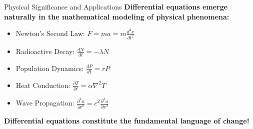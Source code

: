 \documentclass[10pt,aspectratio=169]{beamer}
\newcommand{\concept}[1]{\textbf{#1}}
\begin{document}
\begin{frame}{Physical Significance and Applications}
    \concept{Differential equations emerge naturally in the mathematical modeling of physical phenomena:}
    
    \vspace{0.3cm}
    
    \begin{itemize}
        \item Newton's Second Law: $F = ma = m\frac{d^2x}{dt^2}$
        \item Radioactive Decay: $\frac{dN}{dt} = -\lambda N$
        \item Population Dynamics: $\frac{dP}{dt} = rP$
        \item Heat Conduction: $\frac{\partial T}{\partial t} = \alpha \nabla^2 T$
        \item Wave Propagation: $\frac{\partial^2 u}{\partial t^2} = c^2 \frac{\partial^2 u}{\partial x^2}$
    \end{itemize}
    
    \vspace{0.5cm}
    
    \begin{center}
        \Large\textbf{Differential equations constitute the fundamental language of change!}
    \end{center}
\end{frame}
\end{document}
